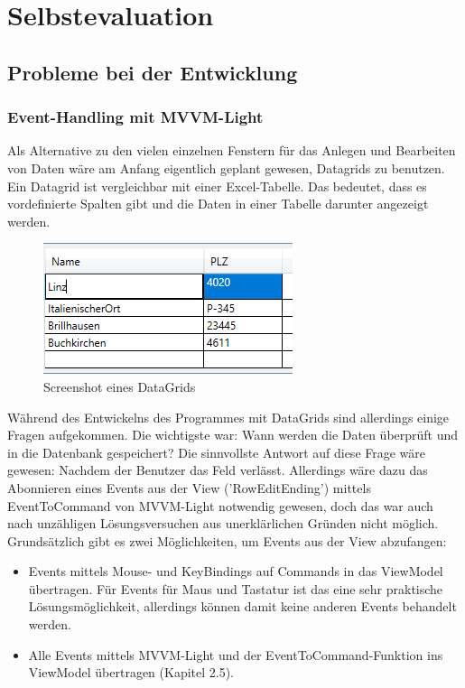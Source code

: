 \chapter{Selbstevaluation}\label{cha:theoretical-background}
\section{Probleme bei der Entwicklung}
\subsection{Event-Handling mit MVVM-Light}
Als Alternative zu den vielen einzelnen Fenstern für das Anlegen und Bearbeiten von Daten wäre am Anfang eigentlich geplant gewesen, Datagrids zu benutzen. Ein Datagrid ist vergleichbar mit einer Excel-Tabelle. Das bedeutet, dass es vordefinierte Spalten gibt und die Daten in einer Tabelle darunter angezeigt werden. 
\begin{figure}[H]
\begin{center}
	\includegraphics[scale=.75]{images/datagrid.png}
\end{center}
	\caption{Screenshot eines DataGrids}
	\label{fig:sample}
\end{figure}
\noindent Während des Entwickelns des Programmes mit DataGrids sind allerdings einige Fragen aufgekommen. Die wichtigste war: Wann werden die Daten überprüft und in die Datenbank gespeichert? Die sinnvollste Antwort auf diese Frage wäre gewesen: Nachdem der Benutzer das Feld verlässt. Allerdings wäre dazu das Abonnieren eines Events aus der View ('RowEditEnding') mittels EventToCommand von MVVM-Light notwendig gewesen, doch das war auch nach unzähligen Lösungsversuchen aus unerklärlichen Gründen nicht möglich. Grundsätzlich gibt es zwei Möglichkeiten, um Events aus der View abzufangen:
\begin{itemize}
\item Events mittels Mouse- und KeyBindings auf Commands in das ViewModel übertragen. Für Events für Maus und Tastatur ist das eine sehr praktische Lösungsmöglichkeit, allerdings können damit keine anderen Events behandelt werden.
\item Alle Events mittels MVVM-Light und der EventToCommand-Funktion ins ViewModel übertragen (Kapitel 2.5).
\end{itemize}
